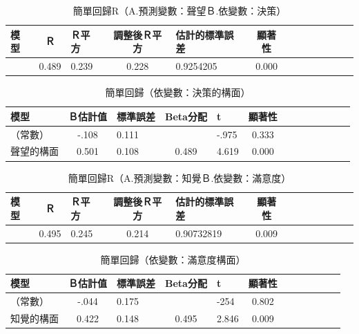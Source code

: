 \begin{table}[H]
\caption{簡單回歸R（A.預測變數：聲望Ｂ.依變數：決策）}
\label{tab:HR4}
\centering
\renewcommand{\arraystretch}{1.2} %
\arrayrulewidth=1pt               %
\tabcolsep=10pt                   %
\begin{tabular}[t]{lclclclclclcl}  %
\hline
 模型&Ｒ&Ｒ平方&調整後Ｒ平方&估計的標準誤差&顯著性\\
\hline
&0.489&0.239&0.228&0.9254205&0.000\\
\hline
\end{tabular}
\end{table}


\begin{table}[H]
\caption{簡單回歸（依變數：決策的構面）}
\label{tab:H4}
\centering
\renewcommand{\arraystretch}{1.2} %
\arrayrulewidth=1pt               %
\tabcolsep=10pt                   %
\begin{tabular}[t]{lclclclclclcl}  %
\hline
 模型&Ｂ估計值&標準誤差&Beta分配&t&顯著性\\
\hline
（常數）&-.108&0.111& &-.975&0.333\\
聲望的構面&0.501&0.108&0.489&4.619&0.000\\
\hline
\end{tabular}
\end{table}


\begin{table}[H]
\caption{簡單回歸R（A.預測變數：知覺Ｂ.依變數：滿意度）}
\label{tab:HR5}
\centering
\renewcommand{\arraystretch}{1.2} %
\arrayrulewidth=1pt               %
\tabcolsep=10pt                   %
\begin{tabular}[t]{lclclclclclcl}  %
\hline
 模型&Ｒ&Ｒ平方&調整後Ｒ平方&估計的標準誤差&顯著性\\
\hline
&0.495&0.245&0.214&0.90732819&0.009\\
\hline
\end{tabular}
\end{table}

\begin{table}[H]
\caption{簡單回歸（依變數：滿意度構面）}
\label{tab:H5}
\centering
\renewcommand{\arraystretch}{1.2} %
\arrayrulewidth=1pt               %
\tabcolsep=10pt                   %
\begin{tabular}[t]{lclclclclclc|}  %
\hline
 模型&Ｂ估計值&標準誤差&Beta分配&t&顯著性\\
\hline
（常數）&-.044&0.175&&-254&0.802\\
知覺的構面&0.422&0.148&0.495&2.846&0.009\\
\hline
\end{tabular}
\end{table}

